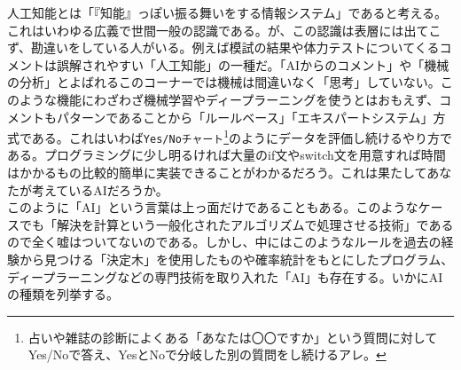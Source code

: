 \documentclass[dvipdfmx,jb5]{jreport}
\newcommand{\terlogy}[2][|]{\colorbox{terlogy}{\texttt{\lstinline#1#2#1}}}
\begin{document}
人工知能とは「『知能』っぽい振る舞いをする情報システム」であると考える。これはいわゆる広義で世間一般の認識である。が、この認識は表層には出てこず、勘違いをしている人がいる。例えば模試の結果や体力テストについてくるコメントは誤解されやすい「人工知能」の一種だ。「AIからのコメント」や「機械の分析」とよばれるこのコーナーでは機械は間違いなく「思考」していない。このような機能にわざわざ機械学習やディープラーニングを使うとはおもえず、コメントもパターンであることから「ルールベース」「エキスパートシステム」方式である。これはいわば\terlogy{Yes/Noチャート}\footnote{占いや雑誌の診断によくある「あなたは〇〇ですか」という質問に対してYes/Noで答え、YesとNoで分岐した別の質問をし続けるアレ。}のようにデータを評価し続けるやり方である。プログラミングに少し明るければ大量のif文やswitch文を用意すれば時間はかかるもの比較的簡単に実装できることがわかるだろう。これは果たしてあなたが考えているAIだろうか。
\\

このように「AI」という言葉は上っ面だけであることもある。このようなケースでも「解決を計算という一般化されたアルゴリズムで処理させる技術」であるので全く嘘はついてないのである。しかし、中にはこのようなルールを過去の経験から見つける「決定木」を使用したものや確率統計をもとにしたプログラム、ディープラーニングなどの専門技術を取り入れた「AI」も存在する。いかにAIの種類を列挙する。
\end{document}
